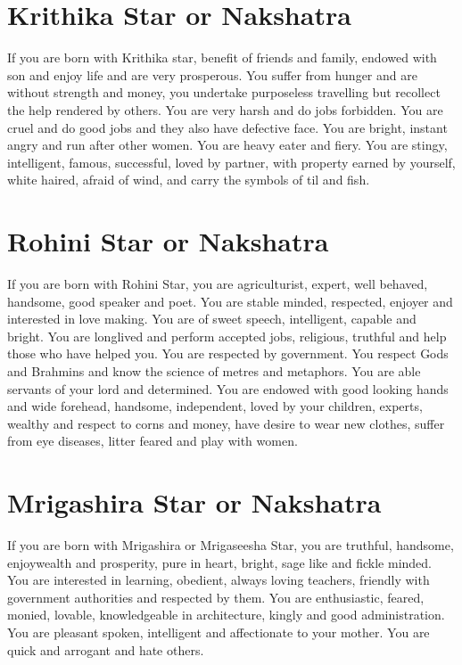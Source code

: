 \documentclass[12pt, right open]{memoir}
\begin{document}
\section{Krithika Star or Nakshatra}

If you are born with Krithika star, benefit of friends and family, endowed with son and enjoy life and are very prosperous. You suffer from hunger and are without strength and money, you undertake purposeless travelling but recollect the help rendered by others. You are very harsh and do jobs forbidden. You are cruel and do good jobs and they also have defective face. You are bright, instant angry and run after other women. You are heavy eater and fiery. You are stingy, intelligent, famous, successful, loved by partner, with property earned by yourself, white haired, afraid of wind, and carry the symbols of til and fish.


\section{Rohini Star or Nakshatra}

If you are born with Rohini Star, you are agriculturist, expert, well behaved, handsome, good speaker and poet. You are stable minded, respected, enjoyer and interested in love making. You are of sweet speech, intelligent, capable and bright. You are longlived and perform accepted jobs, religious, truthful and help those who have helped you. You are respected by government. You respect Gods and Brahmins and know the science of metres and metaphors. You are able servants of your lord and determined. You are endowed with good looking hands and wide forehead, handsome, independent, loved by your children, experts, wealthy and respect to corns and money, have desire to wear new clothes, suffer from eye diseases, litter feared and play with women.


\section{Mrigashira Star or Nakshatra}

If you are born with Mrigashira or Mrigaseesha Star, you are truthful, handsome, enjoywealth and prosperity, pure in heart, bright, sage like and fickle minded. You are interested in learning, obedient, always loving teachers, friendly with government authorities and respected by them. You are enthusiastic, feared, monied, lovable, knowledgeable in architecture, kingly and good administration. You are pleasant spoken, intelligent and affectionate to your mother. You are quick and arrogant and hate others.
\end{document}

